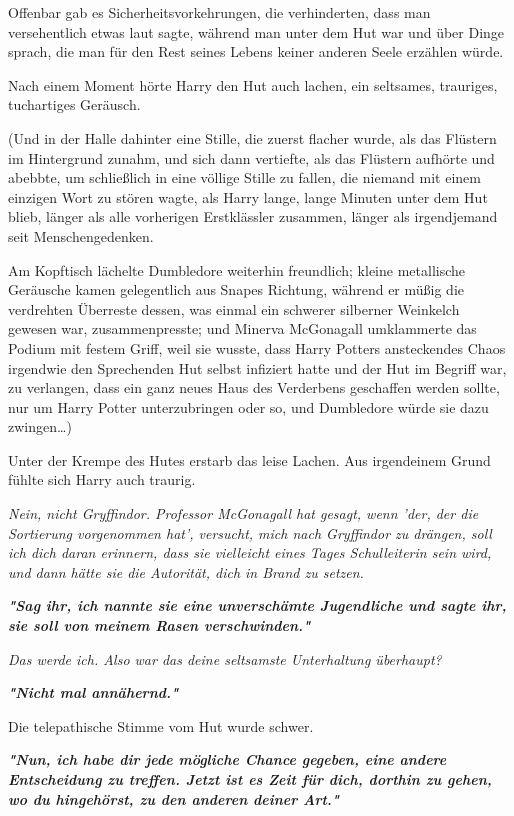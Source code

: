{Offenbar gab es Sicherheitsvorkehrungen, die verhinderten, dass man versehentlich etwas laut sagte, während man unter dem Hut war und über Dinge sprach, die man für den Rest seines Lebens keiner anderen Seele erzählen würde.

Nach einem Moment hörte Harry den Hut auch lachen, ein seltsames, trauriges, tuchartiges Geräusch.

(Und in der Halle dahinter eine Stille, die zuerst flacher wurde, als das Flüstern im Hintergrund zunahm, und sich dann vertiefte, als das Flüstern aufhörte und abebbte, um schließlich in eine völlige Stille zu fallen, die niemand mit einem einzigen Wort zu stören wagte, als Harry lange, lange Minuten unter dem Hut blieb, länger als alle vorherigen Erstklässler zusammen, länger als irgendjemand seit Menschengedenken.

Am Kopftisch lächelte Dumbledore weiterhin freundlich; kleine metallische Geräusche kamen gelegentlich aus Snapes Richtung, während er müßig die verdrehten Überreste dessen, was einmal ein schwerer silberner Weinkelch gewesen war, zusammenpresste; und Minerva McGonagall umklammerte das Podium mit festem Griff, weil sie wusste, dass Harry Potters ansteckendes Chaos irgendwie den Sprechenden Hut selbst infiziert hatte und der Hut im Begriff war, zu verlangen, dass ein ganz neues Haus des Verderbens geschaffen werden sollte, nur um Harry Potter unterzubringen oder so, und Dumbledore würde sie dazu zwingen…)

Unter der Krempe des Hutes erstarb das leise Lachen. Aus irgendeinem Grund fühlte sich Harry auch traurig.

\emph{Nein, nicht Gryffindor. Professor McGonagall hat gesagt, wenn 'der, der die Sortierung vorgenommen hat', versucht, mich nach Gryffindor zu drängen, soll ich dich daran erinnern, dass sie vielleicht eines Tages Schulleiterin sein wird, und dann hätte sie die Autorität, dich in Brand zu setzen.}

\textbf{\emph{"Sag ihr, ich nannte sie eine unverschämte Jugendliche und sagte ihr, sie soll von meinem Rasen verschwinden."}}

\emph{Das werde ich. Also war das deine seltsamste Unterhaltung überhaupt?}

\textbf{\emph{"Nicht mal annähernd."}}

Die telepathische Stimme vom Hut wurde schwer.

\textbf{\emph{"Nun, ich habe dir jede mögliche Chance gegeben, eine andere Entscheidung zu treffen. Jetzt ist es Zeit für dich, dorthin zu gehen, wo du hingehörst, zu den anderen deiner Art."}}

}
